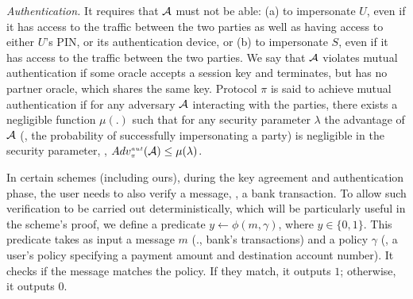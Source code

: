 


\noindent\textit{Authentication.} It requires that $\mathcal{A}$ must not be able: (a)  to impersonate $U$, even if it has access to the traffic between the two parties as well as having access to either $U$'s PIN, or its authentication device, or (b) to impersonate  $S$, even if it has access to the traffic between the two parties.   We say that   $\mathcal{A}$  violates mutual authentication if some oracle accepts a session key and terminates, but has no partner oracle, which shares the same key.  Protocol $\pi$ is said to achieve mutual authentication if for any adversary $\mathcal{A}$  interacting with the parties, there exists a negligible function $\mu(.)$ such that for any security parameter $\lambda$ the advantage of $\mathcal{A}$ (\ie, the probability of successfully impersonating a party)  is negligible in the security parameter, \ie, 
%
$Adv_{\scriptscriptstyle\pi}^{\scriptscriptstyle aut}(\mathcal{A})\leq \mu(\lambda)$.


In certain schemes (including ours), during the key agreement and authentication phase, the user needs to also verify a message, \eg, a bank transaction. To allow such verification to be carried out deterministically, which will be particularly useful in the scheme's proof, we define a predicate $y\leftarrow \phi(m, \gamma)$, where $y\in \{0,1\}$. This predicate takes as input a message $m$ (\eg., bank's transactions) and a policy $\gamma$ (\eg, a user's policy specifying a payment amount and destination account number). It checks if the message matches the policy. If they match, it outputs $1$; otherwise, it outputs $0$.  













